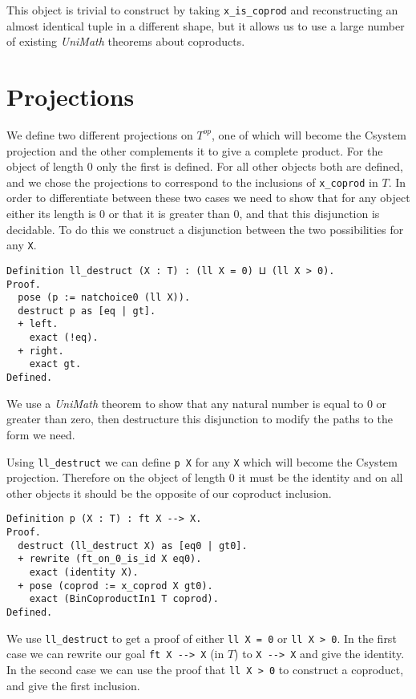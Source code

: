 This object is trivial to construct by taking \lstinline|x_is_coprod| and
reconstructing an almost identical tuple in a different shape, but it allows us
to use a large number of existing \textit{UniMath} theorems about coproducts.

\section{Projections}
We define two different projections on $T^{op}$, one of which will become the
Csystem projection and the other complements it to give a complete product. For
the object of length 0 only the first is defined. For all other objects both are
defined, and we chose the projections to correspond to the inclusions of
\lstinline|x_coprod| in $T$. In order to differentiate between these two cases we
need to show that for any object either its length is 0 or that it is greater
than 0, and that this disjunction is decidable. To do this we construct a
disjunction between the two possibilities for any \lstinline|X|.

\begin{lstlisting}
Definition ll_destruct (X : T) : (ll X = 0) ⨿ (ll X > 0).
Proof.
  pose (p := natchoice0 (ll X)).
  destruct p as [eq | gt].
  + left.
    exact (!eq).
  + right.
    exact gt.
Defined.
\end{lstlisting}

We use a \textit{UniMath} theorem to show that any natural number is equal to 0
or greater than zero, then destructure this disjunction to modify the paths to
the form we need.

Using \lstinline|ll_destruct| we can define \lstinline|p X| for any \lstinline|X| which will
become the Csystem projection. Therefore on the object of length 0 it must be
the identity and on all other objects it should be the opposite of our coproduct
inclusion. 
\begin{lstlisting}
Definition p (X : T) : ft X --> X.
Proof.
  destruct (ll_destruct X) as [eq0 | gt0].
  + rewrite (ft_on_0_is_id X eq0).
    exact (identity X).
  + pose (coprod := x_coprod X gt0).
    exact (BinCoproductIn1 T coprod).
Defined.
\end{lstlisting}

We use \lstinline|ll_destruct| to get a proof of either \lstinline|ll X = 0| or 
\lstinline|ll X > 0|. In the first case we can rewrite our goal \lstinline|ft X --> X| (in
$T$) to \lstinline|X --> X| and give the identity. In the second case we can use the
proof that \lstinline|ll X > 0| to construct a coproduct, and give the first
inclusion.


